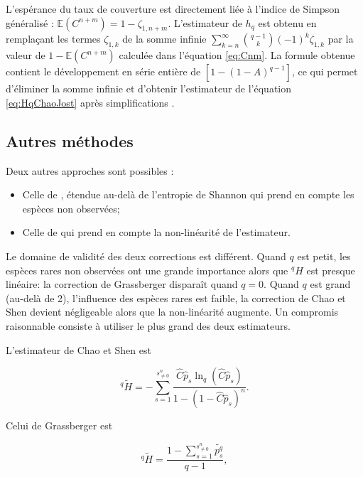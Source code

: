 \documentclass[
  11pt,
  french,
  a4paper,
  extrafontsizes,onecolumn,openright
  ]{memoir}
\providecommand{\tightlist}{%
  \setlength{\itemsep}{0pt}\setlength{\parskip}{0pt}}
\begin{document}
L'espérance du taux de couverture est directement liée à l'indice de Simpson généralisé \autocite{Good1953}: \({\mathbb E}(C^{n+m}) = 1 - \zeta_{1,n+m}\).
L'estimateur de \(h_q\) est obtenu en remplaçant les termes \(\zeta_{1,k}\) de la somme infinie \(\sum_{k=n}^{\infty}{\binom{q-1}{k}(-1)^k \zeta_{1,k}}\) par la valeur de \(1 -{\mathbb E}(C^{n+m})\) calculée dans l'équation \eqref{eq:Cnm}.
La formule obtenue contient le développement en série entière de \([1 - (1-A)^{q-1}]\), ce qui permet d'éliminer la somme infinie et d'obtenir l'estimateur de l'équation \eqref{eq:HqChaoJost} après simplifications \autocite[Appendix S1, Theorem S1.2d]{Chao2015}.

\hypertarget{autres-muxe9thodes}{%
\subsection{Autres méthodes}\label{autres-muxe9thodes}}

Deux autres approches sont possibles \autocite{Marcon2014a}:

\begin{itemize}
\tightlist
\item
  Celle de \textcite{Chao2003}, étendue au-delà de l'entropie de Shannon qui prend en compte les espèces non observées;
\item
  Celle de \textcite{Grassberger1988} qui prend en compte la non-linéarité de l'estimateur.
\end{itemize}

Le domaine de validité des deux corrections est différent.
Quand \(q\) est petit, les espèces rares non observées ont une grande importance alors que \(^{q}\!H\) est presque linéaire: la correction de Grassberger disparaît quand \(q=0\).
Quand \(q\) est grand (au-delà de 2), l'influence des espèces rares est faible, la correction de Chao et Shen devient négligeable alors que la non-linéarité augmente.
Un compromis raisonnable consiste à utiliser le plus grand des deux estimateurs.

L'estimateur de Chao et Shen est

\begin{equation}
  \label{eq:HqChaoShen}
  ^q\!{\tilde{H}} =-\sum^{s^{n}_{\ne 0}}_{s=1}{\frac{\hat{C}{\hat{p}}_s \ln_q\left(\hat{C}{\hat{p}}_s\right)}{1-{\left(1-\hat{C}{\hat{p}}_s\right)}^n}}.
\end{equation}

Celui de Grassberger est

\begin{equation}
  \label{eq:Grassberger}
  ^q\!{\tilde{H}}
  = \frac{1-\sum^{s^{n}_{\ne 0}}_{s=1}{\widetilde{p^q_s}}}{q-1},
\end{equation}
\end{document}
